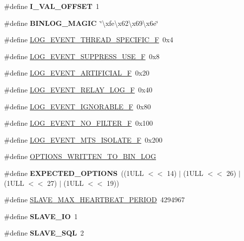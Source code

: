 \begin{DoxyCompactItemize}
\#define {\bfseries I\+\_\+\+V\+A\+L\+\_\+\+O\+F\+F\+S\+ET}~1
\item 
\mbox{\label{group__Replication_ga907ff9a96e48b6d1e1678010197ea485}} 
\#define {\bfseries B\+I\+N\+L\+O\+G\+\_\+\+M\+A\+G\+IC}~\char`\"{}\textbackslash{}xfe\textbackslash{}x62\textbackslash{}x69\textbackslash{}x6e\char`\"{}
\item 
\#define \mbox{\hyperlink{group__Replication_ga1006353b6090b4af079bd4c9d1728eab}{L\+O\+G\+\_\+\+E\+V\+E\+N\+T\+\_\+\+T\+H\+R\+E\+A\+D\+\_\+\+S\+P\+E\+C\+I\+F\+I\+C\+\_\+F}}~0x4
\item 
\#define \mbox{\hyperlink{group__Replication_ga395595981d15e9493cf2d506ed814f0f}{L\+O\+G\+\_\+\+E\+V\+E\+N\+T\+\_\+\+S\+U\+P\+P\+R\+E\+S\+S\+\_\+\+U\+S\+E\+\_\+F}}~0x8
\item 
\#define \mbox{\hyperlink{group__Replication_gae868eb0ba9f8e48fe19b405498d89444}{L\+O\+G\+\_\+\+E\+V\+E\+N\+T\+\_\+\+A\+R\+T\+I\+F\+I\+C\+I\+A\+L\+\_\+F}}~0x20
\item 
\#define \mbox{\hyperlink{group__Replication_ga1155b875ade0c3f1437f6cc557cbabf8}{L\+O\+G\+\_\+\+E\+V\+E\+N\+T\+\_\+\+R\+E\+L\+A\+Y\+\_\+\+L\+O\+G\+\_\+F}}~0x40
\item 
\#define \mbox{\hyperlink{group__Replication_gaa08db1b3439cffa93029dd40e1ddb2d4}{L\+O\+G\+\_\+\+E\+V\+E\+N\+T\+\_\+\+I\+G\+N\+O\+R\+A\+B\+L\+E\+\_\+F}}~0x80
\item 
\#define \mbox{\hyperlink{group__Replication_ga952d3046c7945be04d6e8a7dfabc3f91}{L\+O\+G\+\_\+\+E\+V\+E\+N\+T\+\_\+\+N\+O\+\_\+\+F\+I\+L\+T\+E\+R\+\_\+F}}~0x100
\item 
\#define \mbox{\hyperlink{group__Replication_gaff6f295f5279245c4c78060da0d8ada5}{L\+O\+G\+\_\+\+E\+V\+E\+N\+T\+\_\+\+M\+T\+S\+\_\+\+I\+S\+O\+L\+A\+T\+E\+\_\+F}}~0x200
\item 
\#define \mbox{\hyperlink{group__Replication_ga2dbea1bf90352a83855ef2a91dea9d04}{O\+P\+T\+I\+O\+N\+S\+\_\+\+W\+R\+I\+T\+T\+E\+N\+\_\+\+T\+O\+\_\+\+B\+I\+N\+\_\+\+L\+OG}}
\item 
\mbox{\label{group__Replication_ga15e7cf83c776e643fd0e374ff99a0395}} 
\#define {\bfseries E\+X\+P\+E\+C\+T\+E\+D\+\_\+\+O\+P\+T\+I\+O\+NS}~((1\+U\+L\+L $<$$<$ 14) $\vert$ (1\+U\+L\+L $<$$<$ 26) $\vert$ (1\+U\+L\+L $<$$<$ 27) $\vert$ (1\+U\+L\+L $<$$<$ 19))
\item 
\#define \mbox{\hyperlink{group__Replication_ga9576e3a9774232077c9cd79f015d9efd}{S\+L\+A\+V\+E\+\_\+\+M\+A\+X\+\_\+\+H\+E\+A\+R\+T\+B\+E\+A\+T\+\_\+\+P\+E\+R\+I\+OD}}~4294967
\item 
\mbox{\label{group__Replication_ga568df1d60d9df9467e81f81bf55e627e}} 
\#define {\bfseries S\+L\+A\+V\+E\+\_\+\+IO}~1
\item 
\mbox{\label{group__Replication_ga34d7dd2529eb7a46ec7f8fe1733775e1}} 
\#define {\bfseries S\+L\+A\+V\+E\+\_\+\+S\+QL}~2
\end{DoxyCompactItemize}
